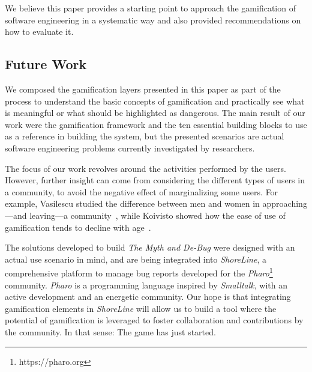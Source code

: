 We believe this paper provides a starting point to approach the gamification of software engineering in a systematic way and also provided recommendations on how to evaluate it. 

\subsection{Future Work}

We composed the gamification layers presented in this paper as part of the process to understand the basic concepts of gamification and practically see what is meaningful or what should be highlighted as dangerous. The main result of our work were the gamification framework and the ten essential building blocks to use as a reference in building the system, but the presented scenarios are actual software engineering problems currently investigated by researchers.

The focus of our work revolves around the activities performed by the users. However, further insight can come from considering the different types of users in a community, to avoid the negative effect of marginalizing some users. For example, Vasilescu \etal studied the difference between men and women in approaching---and leaving---a community~\cite{vasi2012}, while Koivisto \etal showed how the ease of use of gamification tends to decline with age~\cite{koiv2014}.


The solutions developed to build \textit{The Myth and De-Bug} were designed with an actual use scenario in mind, and are being integrated into \textit{ShoreLine}, a comprehensive platform to manage bug reports developed for the \textit{Pharo}\footnote{https://pharo.org} community. \textit{Pharo} is a programming language inspired by \textit{Smalltalk}, with an active development and an energetic community. Our hope is that integrating gamification elements in \textit{ShoreLine} will allow us to build a tool where the potential of gamification is leveraged to foster collaboration and contributions by the community. In that sense: The game has just started.
